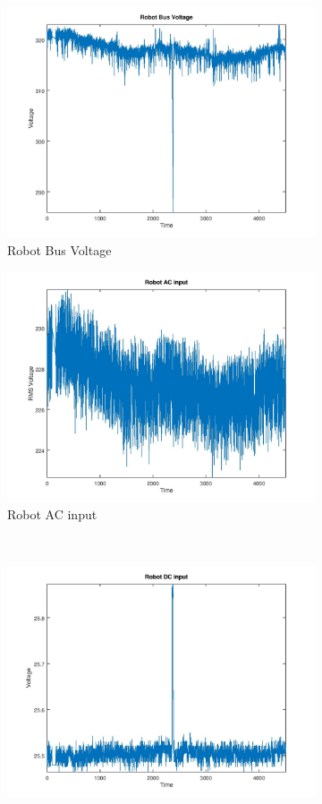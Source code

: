 \begin{figure}[ht]
\begin{subfigure}{.5\textwidth}
 \centering
 \includegraphics[width=.9\linewidth]{Figures/Robot_Bus_Voltage}
 \caption{Robot Bus Voltage}
 \label{fig:Robot Bus Voltage}
\end{subfigure}
\begin{subfigure}{.5\textwidth}
 \centering
 \includegraphics[width=0.9\linewidth]{Figures/Robot_AC_input}
 \caption{Robot AC input}
 \label{fig:Robot AC input}
\end{subfigure}\\
\begin{subfigure}{.5\textwidth}
 \centering
 \includegraphics[width=.9\linewidth]{Figures/Robot_DC_input}

\end{subfigure}
\end{figure}
